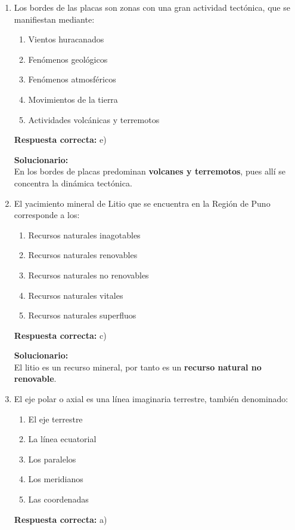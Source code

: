 \begin{enumerate}

	
	\item Los bordes de las placas son zonas con una gran actividad tectónica, que se manifiestan mediante:
	\begin{enumerate}[label=\alph*)]
		\item Vientos huracanados
		\item Fenómenos geológicos
		\item Fenómenos atmosféricos
		\item Movimientos de la tierra
		\item Actividades volcánicas y terremotos
	\end{enumerate}
	\textbf{Respuesta correcta:} e)
	
	\vspace{2mm}
	\textbf{Solucionario:}\\
	En los bordes de placas predominan \textbf{volcanes y terremotos}, pues allí se concentra la dinámica tectónica.
	
	\vspace{6mm}
	
	\item El yacimiento mineral de Litio que se encuentra en la Región de Puno corresponde a los:
	\begin{enumerate}[label=\alph*)]
		\item Recursos naturales inagotables
		\item Recursos naturales renovables
		\item Recursos naturales no renovables
		\item Recursos naturales vitales
		\item Recursos naturales superfluos
	\end{enumerate}
	\textbf{Respuesta correcta:} c)
	
	\vspace{2mm}
	\textbf{Solucionario:}\\
	El litio es un recurso mineral, por tanto es un \textbf{recurso natural no renovable}.
	
	\vspace{6mm}
	
	\item El eje polar o axial es una línea imaginaria terrestre, también denominado:
	\begin{enumerate}[label=\alph*)]
		\item El eje terrestre
		\item La línea ecuatorial
		\item Los paralelos
		\item Los meridianos
		\item Las coordenadas
	\end{enumerate}
	\textbf{Respuesta correcta:} a)
	

\end{enumerate}
